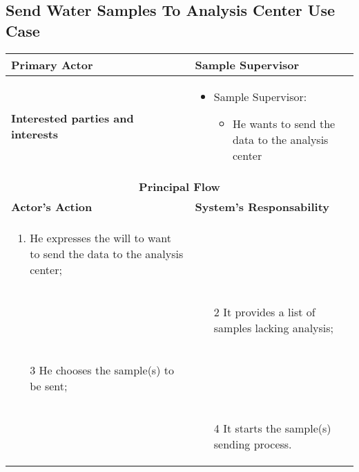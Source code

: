 \subsection{Send Water Samples To Analysis Center Use Case}

\begin{longtable}{|p{7cm}|p{7cm}|}

\hline
\textbf{Primary Actor} & Sample Supervisor\\


\hline
\textbf{Interested parties and interests} &
\begin{itemize}
\item Sample Supervisor:
	\begin{itemize}
 	\item He wants to send the data to the analysis center
	\end{itemize}
\end{itemize}
\\


\hline
\multicolumn{2}{|c|}{\textbf{Principal Flow}} \\

\hline
\textbf{Actor's Action} & \textbf{System's Responsability}\\

\hline

\begin{enumerate}
\item He expresses the will to want to send the data to the analysis center;
\end{enumerate} &\\

& 
\begin{enumerate}
\item[2]It provides a list of samples lacking analysis;
\end{enumerate}\\

\begin{enumerate}
\item[3]He chooses the sample(s) to be sent;			
\end{enumerate} &\\


& 
\begin{enumerate}
\item[4]It starts the sample(s) sending process.
\end{enumerate}\\

\hline
\end{longtable}

